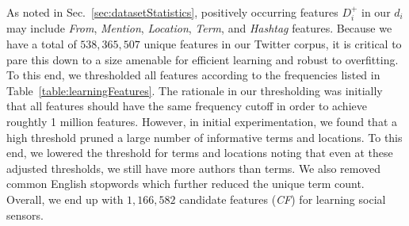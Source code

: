 As noted in Sec.~\ref{sec:datasetStatistics}, positively occurring
features $D_i^+$ in our $d_i$ may include
\textit{From}, \textit{Mention}, \textit{Location}, \textit{Term}, and \textit{Hashtag} features.
%
Because we have a total of $538,365,507$ unique features in our
Twitter corpus, it is critical to pare this down to a size amenable
for efficient learning and robust to overfitting.  To this end, we
thresholded all features according to the frequencies listed in
Table~\ref{table:learningFeatures}.  The rationale in our thresholding
was initially that all features should have the same frequency cutoff
in order to achieve roughtly 1 million features.  However, in 
initial experimentation, we found that a high threshold pruned a large
number of informative terms and locations.  To this end, we lowered
the threshold for terms and locations noting that even at these
adjusted thresholds, we still have more authors than terms.  We
also removed common English stopwords which further reduced the
unique term count.  Overall, we end up with $1,166,582$
candidate features (\textit{CF}) for learning social sensors.


